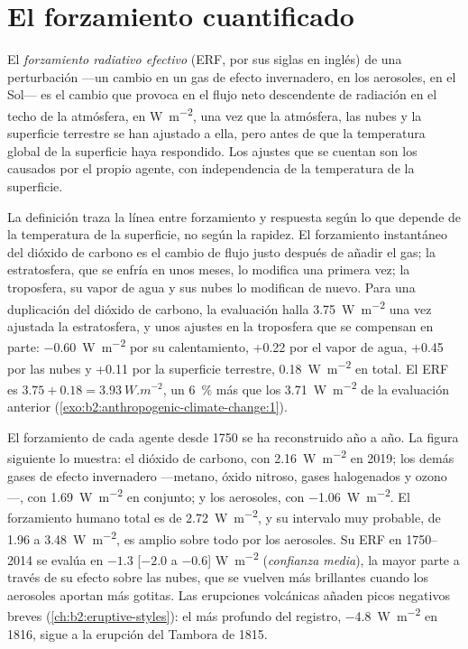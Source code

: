 \section{El forzamiento cuantificado}\label{sec:b2:anthropogenic-climate-change:forcing}

\begin{definition}\label{def:b2:anthropogenic-climate-change:erf}
El \emph{forzamiento radiativo efectivo} (ERF, por sus siglas en inglés) de una perturbación
---un cambio en un gas de efecto invernadero, en los aerosoles, en el Sol--- es el cambio que provoca en el flujo neto
descendente de radiación en el techo de la atmósfera, en \unit{W.m^{-2}}, una vez que la atmósfera,
las nubes y la superficie terrestre se han ajustado a ella, pero antes de que la temperatura global de la superficie
haya respondido. Los ajustes que se cuentan son los causados por el propio agente, con independencia de la
temperatura de la superficie.
\end{definition}

La definición traza la línea entre forzamiento y respuesta según lo que depende de la temperatura de la
superficie, no según la rapidez. El forzamiento instantáneo del dióxido de carbono es el cambio de flujo justo
después de añadir el gas; la estratosfera, que se enfría en unos meses, lo modifica una primera vez;
la troposfera, su vapor de agua y sus nubes lo modifican de nuevo. Para una duplicación del dióxido de
carbono, la evaluación halla \qty{3.75}{W.m^{-2}} una vez ajustada la estratosfera, y unos
ajustes en la troposfera que se compensan en parte: \qty{-0.60}{W.m^{-2}} por su calentamiento, +0.22
por el vapor de agua, +0.45 por las nubes y +0.11 por la superficie terrestre, \qty{+0.18}{W.m^{-2}} en total.
El ERF es $3.75 + 0.18 = \qty{3.93}{W.m^{-2}}$, un \qty{6}{\percent} más que los
\qty{3.71}{W.m^{-2}} de la evaluación anterior (\cref{exo:b2:anthropogenic-climate-change:1}).

El forzamiento de cada agente desde 1750 se ha reconstruido año a año. La figura siguiente lo
muestra: el dióxido de carbono, con \qty{2.16}{W.m^{-2}} en 2019; los demás gases de efecto invernadero ---metano,
óxido nitroso, gases halogenados y ozono---, con \qty{1.69}{W.m^{-2}} en conjunto; y los
aerosoles, con \qty{-1.06}{W.m^{-2}}. El forzamiento humano total es de \qty{2.72}{W.m^{-2}}, y su intervalo muy
probable, de 1.96 a \qty{3.48}{W.m^{-2}}, es amplio sobre todo por los aerosoles. Su ERF en
1750--2014 se evalúa en $-1.3$ [$-2.0$ a $-0.6$] \unit{W.m^{-2}} (\emph{confianza media}),
la mayor parte a través de su efecto sobre las nubes, que se vuelven más brillantes cuando los aerosoles aportan más gotitas.
Las erupciones volcánicas añaden picos negativos breves (\cref{ch:b2:eruptive-styles}): el más profundo del
registro, \qty{-4.8}{W.m^{-2}} en 1816, sigue a la erupción del Tambora de 1815.


